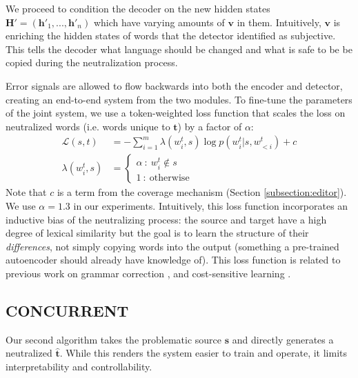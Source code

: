 We proceed to condition the decoder on the new hidden states $\mathbf{H}' = (\mathbf{h'}_1, ..., \mathbf{h}'_n)$ which have varying amounts of $\mathbf{v}$ in them. Intuitively, $\mathbf{v}$ is enriching the hidden states of words that the detector identified as subjective. This tells the decoder what language should be changed and what is safe to be be copied during the neutralization process. 

Error signals are allowed to flow backwards into both the encoder and detector, creating an end-to-end system from the two modules. To fine-tune the parameters of the joint system, we use a token-weighted loss function that scales  the loss on neutralized words (i.e. words unique to $\mathbf{t}$) by a factor of  $\alpha$:
\vspace*{-4pt}
\begin{align*}
    \mathcal{L}(s, t) &= - \sum_{i=1}^m \lambda(w^t_i, s) \log p(w^t_i \vert s, w^t_{<i}) + c \\
    \lambda(w^t_i, s) &= \left\{
                \begin{array}{ll}
                  \alpha\ :\ w^t_i \not \in s\\
                  1\ :\ \mathrm{otherwise}
                \end{array}
        \right.
\end{align*}
Note that $c$ is a term from the coverage mechanism (Section \ref{subsection:editor}). We use $\alpha = 1.3$ in our experiments. Intuitively, this loss function incorporates an inductive bias of the neutralizing  process: the source and target have a high degree of lexical similarity but the goal is to learn the structure of their \emph{differences}, not simply copying words into the output (something a pre-trained autoencoder should already have knowledge of). This loss function is related to previous work on grammar correction \cite{junczys2018approaching}, and cost-sensitive learning \cite{zhou2006training}.







\subsection{CONCURRENT}

Our second algorithm takes the problematic source $\textbf{s}$ and directly generates a neutralized $\mathbf{\hat{t}}$. While this renders the system easier to train and operate, it limits interpretability and controllability. 

